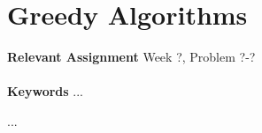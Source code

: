 
\chapter{Greedy Algorithms}
\label{ch:greedyalgorithms}

\textbf{Relevant Assignment} Week ?, Problem ?-?\\\\
\textbf{Keywords} ...
\vspace{1in}

\noindent ...

